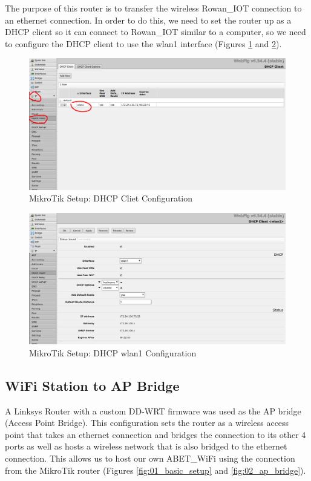 \documentclass{article}
\begin{document}
The purpose of this router is to transfer the wireless Rowan\_IOT connection to an ethernet
connection. In order to do this, we need to set the router up as a DHCP client
so it can connect to Rowan\_IOT similar to a computer, so we need to configure
the DHCP client to use the wlan1 interface (Figures \ref{fig:05_dhcp_client} and
\ref{fig:06_dhcp_wlan1}).

\begin{figure}[H]
  \begin{center}
    \includegraphics[scale=0.30]{./img/mikrotik/05_dhcp_client.png}
  \end{center}
  \caption{MikroTik Setup: DHCP Cliet Configuration}
  \label{fig:05_dhcp_client}
\end{figure}

\begin{figure}[H]
  \begin{center}
    \includegraphics[scale=0.30]{./img/mikrotik/06_dhcp_wlan1.png}
  \end{center}
  \caption{MikroTik Setup: DHCP wlan1 Configuration}
  \label{fig:06_dhcp_wlan1}
\end{figure}

\subsection{WiFi Station to AP Bridge}
A Linksys Router with a custom DD-WRT firmware was used as the AP bridge (Access
Point Bridge). This configuration sets the router as a wireless access point
that takes an ethernet connection and bridges the connection to its other 4
ports as well as hosts a wireless network that is also bridged to the ethernet
connection. This allows us to host our own ABET\_WiFi using the connection from
the MikroTik router (Figures \ref{fig:01_basic_setup} and
\ref{fig:02_ap_bridge}).
\end{document}
